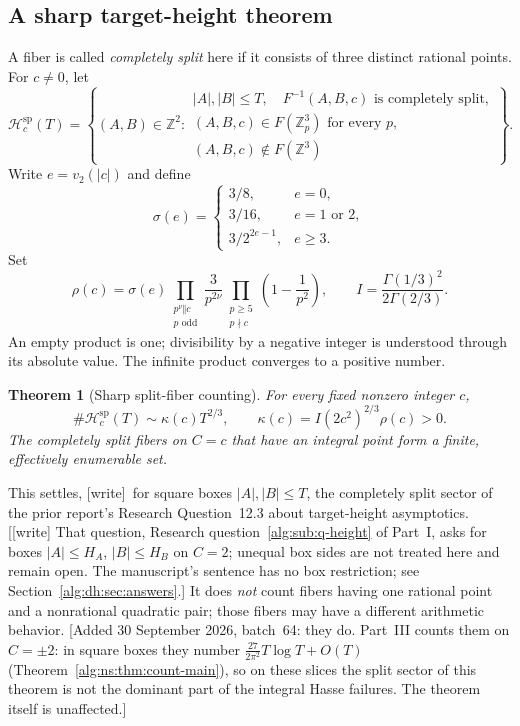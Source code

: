 \documentclass[11pt]{article}
\numberwithin{equation}{section}
\newtheorem{theorem}{Theorem}[section]
\theoremstyle{plain}
\theoremstyle{plain}
\theoremstyle{plain}
\theoremstyle{definition}
\theoremstyle{definition}
\theoremstyle{definition}
\theoremstyle{remark}
\newcommand{\Z}{\mathbb Z}\newcommand{\Q}{\mathbb Q}
\newcommand{\wtag}{\textup{[write]}}%
\newcommand{\Hsplit}{\mathcal H^{\mathrm{sp}}}
\begin{document}
\subsection{A sharp target-height theorem}
A fiber is called \emph{completely split} here if it consists of three
distinct rational points. For $c\ne0$, let
\begin{equation}\label{alg:dh:eq:Hdefinition}
\Hsplit_c(T)=\left\{(A,B)\in\Z^2:
\begin{array}{l}
 |A|,|B|\le T,\quad F^{-1}(A,B,c)\text{ is completely split},\\
 (A,B,c)\in F(\Z_p^3)\text{ for every }p,\\
 (A,B,c)\notin F(\Z^3)
\end{array}\right\}.
\end{equation}
Write $e=v_2(|c|)$ and define
\begin{equation}\label{alg:dh:eq:sigma}
\sigma(e)=
\begin{cases}
 3/8,&e=0,\\
 3/16,&e=1\text{ or }2,\\
 3/2^{2e-1},&e\ge3.
\end{cases}
\end{equation}
Set
\begin{equation}\label{alg:dh:eq:rho}
\rho(c)=\sigma(e)
 \prod_{\substack{p^\nu\Vert c\\p\text{ odd}}}\frac{3}{p^{2\nu}}
 \prod_{\substack{p\ge5\\p\nmid c}}\left(1-\frac1{p^2}\right),
\qquad
 I=\frac{\Gamma(1/3)^2}{2\Gamma(2/3)}.
\end{equation}
An empty product is one; divisibility by a negative integer is understood
through its absolute value. The infinite product converges to a positive
number.

\begin{theorem}[Sharp split-fiber counting]\label{alg:dh:thm:headline-count}
For every fixed nonzero integer $c$,
\begin{equation}\label{alg:dh:eq:mainasymptotic}
 \#\Hsplit_c(T)\sim \kappa(c)T^{2/3},\qquad
 \kappa(c)=I(2c^2)^{2/3}\rho(c)>0.
\end{equation}
The completely split fibers on $C=c$ that have an integral point form a
finite, effectively enumerable set.
\end{theorem}
This settles, \wtag{}~for square boxes $|A|,|B|\le T$, the completely
split sector of the prior report's
Research Question~12.3 about target-height asymptotics.
[\wtag{} That question, Research question~\ref{alg:sub:q-height} of
Part~I, asks for boxes $|A|\le H_A$, $|B|\le H_B$ on $C=2$; unequal box
sides are not treated here and remain open. The manuscript's sentence
has no box restriction; see Section~\ref{alg:dh:sec:answers}.] It does \emph{not}
count fibers having one rational point and a nonrational quadratic pair;
those fibers may have a different arithmetic behavior.
[Added 30 September 2026, batch~64: they do. Part~III counts them on
$C=\pm2$: in square boxes they number $\frac{27}{2\pi^2}T\log T+O(T)$
(Theorem~\ref{alg:ns:thm:count-main}), so on these slices the split sector
of this theorem is not the dominant part of the integral Hasse failures.
The theorem itself is unaffected.]
\end{document}
